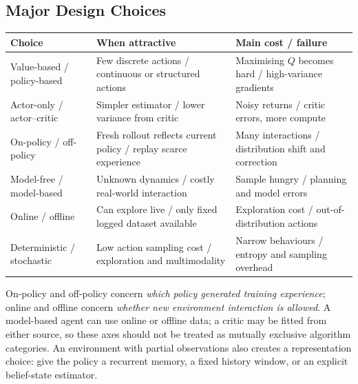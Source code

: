 \subsection{Major Design Choices}\label{sec:rl-choices}
\begin{center}\begingroup\footnotesize\setlength{\tabcolsep}{3pt}
\begin{tabular}{|p{.24\linewidth}|p{.34\linewidth}|p{.33\linewidth}|}\hline
\textbf{Choice} & \textbf{When attractive} & \textbf{Main cost / failure}\\ \hline
Value-based / policy-based & Few discrete actions / continuous or structured actions & Maximising $Q$ becomes hard / high-variance gradients\\ \hline
Actor-only / actor--critic & Simpler estimator / lower variance from critic & Noisy returns / critic errors, more compute\\ \hline
On-policy / off-policy & Fresh rollout reflects current policy / replay scarce experience & Many interactions / distribution shift and correction\\ \hline
Model-free / model-based & Unknown dynamics / costly real-world interaction & Sample hungry / planning and model errors\\ \hline
Online / offline & Can explore live / only fixed logged dataset available & Exploration cost / out-of-distribution actions\\ \hline
Deterministic / stochastic & Low action sampling cost / exploration and multimodality & Narrow behaviours / entropy and sampling overhead\\ \hline
\end{tabular}\endgroup\end{center}
On-policy and off-policy concern \emph{which policy generated training experience}; online and offline concern \emph{whether new environment interaction is allowed}.
A model-based agent can use online or offline data; a critic may be fitted from either source, so these axes should not be treated as mutually exclusive algorithm categories.
An environment with partial observations also creates a representation choice: give the policy a recurrent memory, a fixed history window, or an explicit belief-state estimator.

